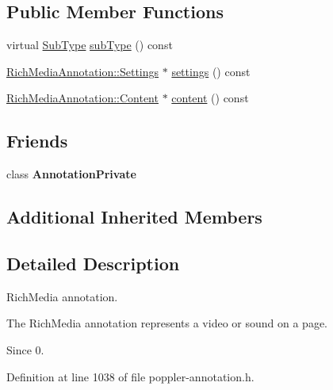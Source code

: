 \subsection*{Public Member Functions}
\begin{DoxyCompactItemize}
\item 
virtual \hyperlink{class_poppler_1_1_annotation_a2d592999c330949d64679cfa9e81113f}{Sub\+Type} \hyperlink{class_poppler_1_1_rich_media_annotation_ae853275d25fdd1e415ce28045dbc857f}{sub\+Type} () const
\item 
\hyperlink{class_poppler_1_1_rich_media_annotation_1_1_settings}{Rich\+Media\+Annotation\+::\+Settings} $\ast$ \hyperlink{class_poppler_1_1_rich_media_annotation_ad80e513295b78d1d38d89a360a624649}{settings} () const
\item 
\hyperlink{class_poppler_1_1_rich_media_annotation_1_1_content}{Rich\+Media\+Annotation\+::\+Content} $\ast$ \hyperlink{class_poppler_1_1_rich_media_annotation_af648b2e0f5c00ab7bc01d0bb1ae5681f}{content} () const
\end{DoxyCompactItemize}
\subsection*{Friends}
\begin{DoxyCompactItemize}
\item 
\mbox{\label{class_poppler_1_1_rich_media_annotation_add0bc3e32e560f9e9eb3025587c1ad54}} 
class {\bfseries Annotation\+Private}
\end{DoxyCompactItemize}
\subsection*{Additional Inherited Members}


\subsection{Detailed Description}
Rich\+Media annotation. 

The Rich\+Media annotation represents a video or sound on a page.

\begin{DoxySince}{Since}
0. 
\end{DoxySince}


Definition at line 1038 of file poppler-\/annotation.\+h.



